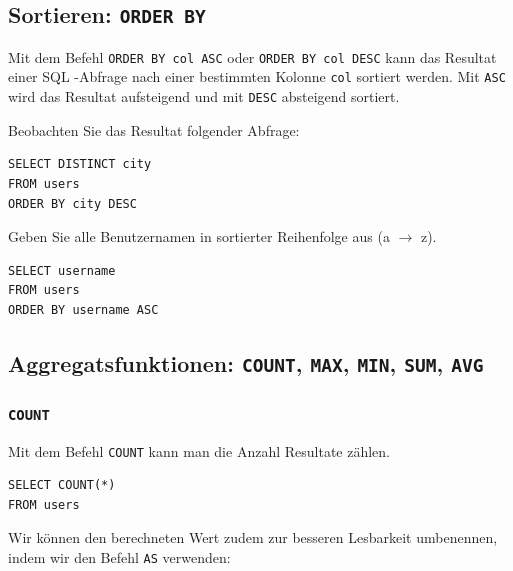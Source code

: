 \subsection{Sortieren: \lstinline[style=sql]|ORDER BY|}

Mit dem Befehl \lstinline[style=sql]|ORDER BY col ASC| oder \lstinline[style=sql]|ORDER BY col DESC| kann das Resultat einer \gls{SQL} -Abfrage nach einer bestimmten Kolonne \lstinline[style=sql]|col| sortiert werden. Mit \lstinline[style=sql]|ASC| wird das Resultat aufsteigend und mit \lstinline[style=sql]|DESC| absteigend sortiert.

\begin{myexample}
Beobachten Sie das Resultat folgender Abfrage:

\begin{lstlisting}[style=sql]
SELECT DISTINCT city 
FROM users 
ORDER BY city DESC
\end{lstlisting}
\end{myexample}

\begin{aufgabe}{}
Geben Sie alle Benutzernamen in sortierter Reihenfolge aus (a $\rightarrow$ z).
\begin{myantwort}
\begin{lstlisting}[style=sql]
SELECT username
FROM users
ORDER BY username ASC
\end{lstlisting}
\end{myantwort}
\end{aufgabe}

\subsection{Aggregatsfunktionen: \lstinline[style=sql]|COUNT|, \lstinline[style=sql]|MAX|, \lstinline[style=sql]|MIN|, \lstinline[style=sql]|SUM|, \lstinline[style=sql]|AVG|}
\subsubsection{\lstinline[style=sql]|COUNT|}

Mit dem Befehl \lstinline[style=sql]|COUNT| kann man die Anzahl Resultate zählen. 

\begin{lstlisting}[style=sql]
SELECT COUNT(*)
FROM users
\end{lstlisting}

Wir können den berechneten Wert zudem zur besseren Lesbarkeit umbenennen, indem wir den Befehl \lstinline[style=sql]|AS| verwenden:


